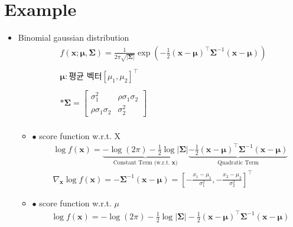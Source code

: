 \documentclass[12pt,a4paper, fleqn]{article}
\begin{document}
\section{Example}
\begin{itemize}
    \item Binomial gaussian distribution
    \begin{equation*}
        \begin{aligned}
        &f(\mathbf{x}; \boldsymbol{\mu}, \boldsymbol{\Sigma}) = \frac{1}{2\pi \sqrt{|\boldsymbol{\Sigma}|}} \exp\left( -\frac{1}{2}(\mathbf{x}-\boldsymbol{\mu})^\top \boldsymbol{\Sigma}^{-1} (\mathbf{x}-\boldsymbol{\mu}) \right)\\\\
        &\boldsymbol{\mu}: \text{평균 벡터} [\mu_1, \mu_2]^\top\\\\
        &*\boldsymbol{\Sigma} = \begin{bmatrix} \sigma_1^2 & \rho\sigma_1\sigma_2 \\ \rho\sigma_1\sigma_2 & \sigma_2^2 \end{bmatrix}\\
        \end{aligned}
        \nonumber
    \end{equation*}

    \begin{itemize}
        \item[] $\bullet$ score function w.r.t. X
        \begin{equation}
            \begin{aligned}
            &\log f(\mathbf{x}) = \underbrace{-\log(2\pi) - \frac{1}{2} \log |\boldsymbol{\Sigma}|}_{\text{Constant Term (w.r.t. } \mathbf{x})} \underbrace{-\frac{1}{2} (\mathbf{x}-\boldsymbol{\mu})^\top \boldsymbol{\Sigma}^{-1} (\mathbf{x}-\boldsymbol{\mu})}_{\text{Quadratic Term}}\\
            &\nabla_{\mathbf{x}} \log f(\mathbf{x}) = -\boldsymbol{\Sigma}^{-1}(\mathbf{x}-\boldsymbol{\mu}) = \left[ -\frac{x_1-\mu_1}{\sigma_1^2}, -\frac{x_2-\mu_2}{\sigma_2^2} \right]^\top
            \end{aligned}
            \nonumber
        \end{equation}

        \item[] $\bullet$ score function w.r.t. $\mu$
        \begin{equation}
            \begin{aligned}
            &\log f(\mathbf{x}) = -\log(2\pi) - \frac{1}{2} \log |\boldsymbol{\Sigma}| - \frac{1}{2}(\mathbf{x}-\boldsymbol{\mu})^\top \boldsymbol{\Sigma}^{-1} (\mathbf{x}-\boldsymbol{\mu})\\
            \end{aligned}
            \nonumber
        \end{equation}
    \end{itemize}
\end{itemize}
\newpage
\end{document}
